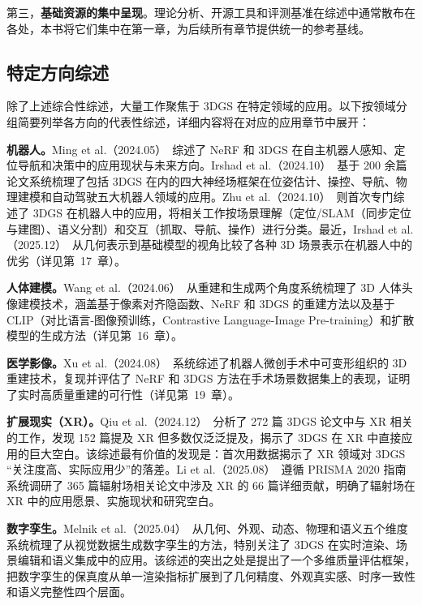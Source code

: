 第三，\textbf{基础资源的集中呈现}。理论分析、开源工具和评测基准在综述中通常散布在各处，本书将它们集中在第一章，为后续所有章节提供统一的参考基线。

\subsection{特定方向综述}

除了上述综合性综述，大量工作聚焦于 3DGS 在特定领域的应用。以下按领域分组简要列举各方向的代表性综述，详细内容将在对应的应用章节中展开：

\textbf{机器人。}Ming et al.（2024.05）~\cite{2405_05526}综述了 NeRF 和 3DGS 在自主机器人感知、定位导航和决策中的应用现状与未来方向。Irshad et al.（2024.10）~\cite{2410_20220}基于 200 余篇论文系统梳理了包括 3DGS 在内的四大神经场框架在位姿估计、操控、导航、物理建模和自动驾驶五大机器人领域的应用。Zhu et al.（2024.10）~\cite{2410_12262}则首次专门综述了 3DGS 在机器人中的应用，将相关工作按场景理解（定位/SLAM（同步定位与建图）、语义分割）和交互（抓取、导航、操作）进行分类。最近，Irshad et al.（2025.12）~\cite{2512_03422}从几何表示到基础模型的视角比较了各种 3D 场景表示在机器人中的优劣（详见第~17~章）。

\textbf{人体建模。}Wang et al.（2024.06）~\cite{2406_04253}从重建和生成两个角度系统梳理了 3D 人体头像建模技术，涵盖基于像素对齐隐函数、NeRF 和 3DGS 的重建方法以及基于 CLIP（对比语言-图像预训练，Contrastive Language-Image Pre-training）和扩散模型的生成方法（详见第~16~章）。

\textbf{医学影像。}Xu et al.（2024.08）~\cite{2408_04426}系统综述了机器人微创手术中可变形组织的 3D 重建技术，复现并评估了 NeRF 和 3DGS 方法在手术场景数据集上的表现，证明了实时高质量重建的可行性（详见第~19~章）。

\textbf{扩展现实（XR）。}Qiu et al.（2024.12）~\cite{2412_06257}分析了 272 篇 3DGS 论文中与 XR 相关的工作，发现 152 篇提及 XR 但多数仅泛泛提及，揭示了 3DGS 在 XR 中直接应用的巨大空白。该综述最有价值的发现是：首次用数据揭示了 XR 领域对 3DGS ``关注度高、实际应用少''的落差。Li et al.（2025.08）~\cite{2508_04326}遵循 PRISMA 2020 指南系统调研了 365 篇辐射场相关论文中涉及 XR 的 66 篇详细贡献，明确了辐射场在 XR 中的应用愿景、实施现状和研究空白。

\textbf{数字孪生。}Melnik et al.（2025.04）~\cite{2504_13159}从几何、外观、动态、物理和语义五个维度系统梳理了从视觉数据生成数字孪生的方法，特别关注了 3DGS 在实时渲染、场景编辑和语义集成中的应用。该综述的突出之处是提出了一个多维质量评估框架，把数字孪生的保真度从单一渲染指标扩展到了几何精度、外观真实感、时序一致性和语义完整性四个层面。

